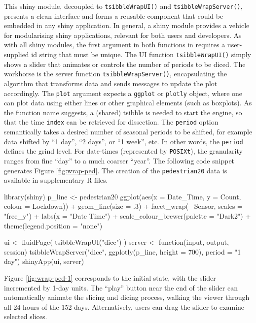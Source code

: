 This shiny module, decoupled to \texttt{tsibbleWrapUI()} and
\texttt{tsibbleWrapServer()}, presents a clean interface and forms a
reusable component that could be embedded in any shiny application. In
general, a shiny module provides a vehicle for modularising shiny
applications, relevant for both users and developers. As with all shiny
modules, the first argument in both functions in 
requires a user-supplied id string that must be unique. The UI function
\texttt{tsibbleWrapUI()} simply shows a slider that animates or controls
the number of periods to be diced. The workhorse is the server function
\texttt{tsibbleWrapServer()}, encapsulating the algorithm that
transforms data and sends messages to update the plot accordingly. The
\texttt{plot} argument expects a \texttt{ggplot} or \texttt{plotly}
object, where one can plot data using either lines or other graphical
elements (such as boxplots). As the function name suggests, a (shared)
tsibble is needed to start the engine, so that the time \texttt{index}
can be retrieved for dissection. The \texttt{period} option semantically
takes a desired number of seasonal periods to be shifted, for example
data shifted by ``1 day'', ``2 days'', or ``1 week'', etc. In other
words, the \texttt{period} defines the grind level. For date-times
(represented by \texttt{POSIXt}), the granularity ranges from fine
``day'' to a much coarser ``year''. The following code snippet generates
Figure \ref{fig:wrap-ped}. The creation of the \texttt{pedestrian20}
data is available in supplementary R files.

\begin{Schunk}
\begin{Sinput}
library(shiny)
p_line <- pedestrian20 %
  ggplot(aes(x = Date_Time, y = Count, colour = Lockdown)) +
  geom_line(size = .3) +
  facet_wrap(~ Sensor, scales = "free_y") +
  labs(x = "Date Time") +
  scale_colour_brewer(palette = "Dark2") +
  theme(legend.position = "none")

ui <- fluidPage(
  tsibbleWrapUI("dice")
)
server <- function(input, output, session) {
  tsibbleWrapServer("dice", ggplotly(p_line, height = 700), period = "1 day")
}
shinyApp(ui, server)
\end{Sinput}
\end{Schunk}

Figure \ref{fig:wrap-ped-1} corresponds to the initial state, with the
slider incremented by 1-day units. The ``play'' button near the end of
the slider can automatically animate the slicing and dicing process,
walking the viewer through all 24 hours of the 152 days. Alternatively,
users can drag the slider to examine selected slices.

